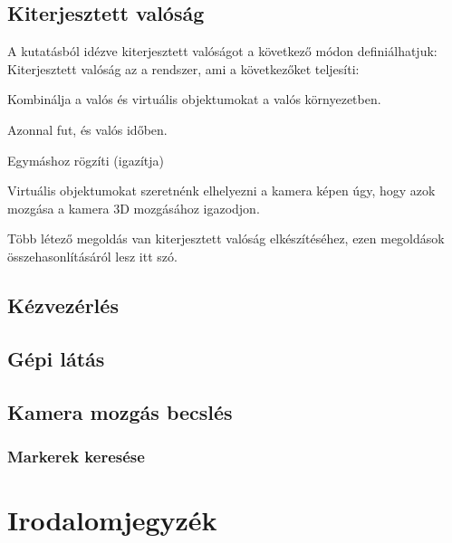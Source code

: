 \documentclass[12pt,a4paper,oneside]{report} %
\begin{document}
\section{Kiterjesztett valóság}
\label{kitvalo}
A \cite{azuma2001recent} kutatásból idézve  kiterjesztett valóságot a következő módon definiálhatjuk: Kiterjesztett valóság az a rendszer, ami a következőket teljesíti:
\begin{compactitem}
	\item Kombinálja a valós és virtuális objektumokat a valós környezetben.
	\item Azonnal fut, és valós időben.
	\item Egymáshoz rögzíti (igazítja) %
\end{compactitem}
Virtuális objektumokat szeretnénk elhelyezni a kamera képen úgy, hogy azok mozgása a kamera 3D mozgásához igazodjon. 
 \par Több létező megoldás van kiterjesztett valóság elkészítéséhez, ezen megoldások összehasonlításáról lesz itt szó.

\section{Kézvezérlés}
\label{kezvez}

\section{Gépi látás}
\section{Kamera mozgás becslés}
\subsection{Markerek keresése}




\newpage
\chapter*{Irodalomjegyzék}
\printbibliography[heading=none]
\newpage
\listoffigures
{}
\end{document}
